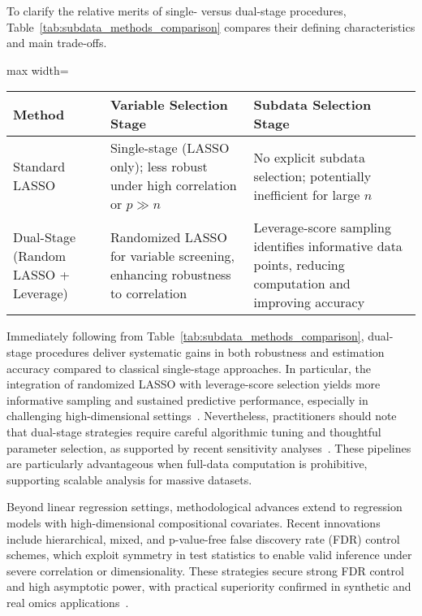 \documentclass[sigconf]{acmart}
\begin{document}
To clarify the relative merits of single- versus dual-stage procedures, Table~\ref{tab:subdata_methods_comparison} compares their defining characteristics and main trade-offs.

\begin{table*}[htbp]
\centering
\caption{Comparison of Traditional and Dual-Stage Subdata Selection Methods}
\label{tab:subdata_methods_comparison}
\begin{adjustbox}{max width=\textwidth}
\begin{tabular}{lll}
\toprule
\textbf{Method} & \textbf{Variable Selection Stage} & \textbf{Subdata Selection Stage} \\
\midrule
Standard LASSO & Single-stage (LASSO only); less robust under high correlation or $p \gg n$ & No explicit subdata selection; potentially inefficient for large $n$ \\
Dual-Stage (Random LASSO + Leverage) & Randomized LASSO for variable screening, enhancing robustness to correlation & Leverage-score sampling identifies informative data points, reducing computation and improving accuracy \\
\bottomrule
\end{tabular}
\end{adjustbox}
\end{table*}

Immediately following from Table~\ref{tab:subdata_methods_comparison}, dual-stage procedures deliver systematic gains in both robustness and estimation accuracy compared to classical single-stage approaches. In particular, the integration of randomized LASSO with leverage-score selection yields more informative sampling and sustained predictive performance, especially in challenging high-dimensional settings~\cite{ref102}. Nevertheless, practitioners should note that dual-stage strategies require careful algorithmic tuning and thoughtful parameter selection, as supported by recent sensitivity analyses~\cite{ref102}. These pipelines are particularly advantageous when full-data computation is prohibitive, supporting scalable analysis for massive datasets.

Beyond linear regression settings, methodological advances extend to regression models with high-dimensional compositional covariates. Recent innovations include hierarchical, mixed, and p-value-free false discovery rate (FDR) control schemes, which exploit symmetry in test statistics to enable valid inference under severe correlation or dimensionality. These strategies secure strong FDR control and high asymptotic power, with practical superiority confirmed in synthetic and real omics applications~\cite{ref102}.
\end{document}
